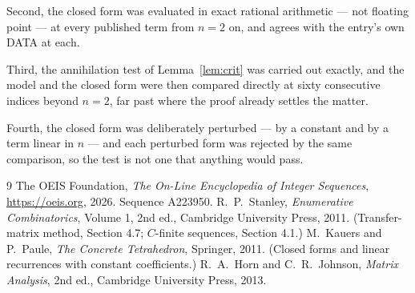 \documentclass[11pt,a4paper]{article}
\theoremstyle{plain}
\theoremstyle{definition}
\begin{document}
Second, the closed form was evaluated in exact rational arithmetic --- not floating point ---
at every published term from $n=2$ on, and agrees with the entry's own DATA at each.

Third, the annihilation test of Lemma~\ref{lem:crit} was carried out exactly, and the model
and the closed form were then compared directly at sixty consecutive indices beyond
$n=2$, far past where the proof already settles the matter.

Fourth, the closed form was deliberately perturbed --- by a constant and by a term linear in
$n$ --- and each perturbed form was rejected by the same comparison, so the test is not one
that anything would pass.

\begin{thebibliography}{9}
 The OEIS Foundation, \emph{The On-Line Encyclopedia of Integer
Sequences}, \url{https://oeis.org}, 2026. Sequence A223950.
 R.~P.~Stanley, \emph{Enumerative Combinatorics}, Volume 1, 2nd ed.,
Cambridge University Press, 2011. (Transfer-matrix method, Section 4.7; $C$-finite sequences,
Section 4.1.)
 M.~Kauers and P.~Paule, \emph{The Concrete Tetrahedron}, Springer, 2011.
(Closed forms and linear recurrences with constant coefficients.)
 R.~A.~Horn and C.~R.~Johnson, \emph{Matrix Analysis}, 2nd ed., Cambridge
University Press, 2013.
\end{thebibliography}
\end{document}
